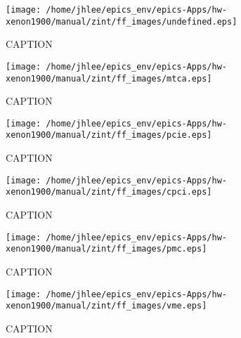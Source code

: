 \begin{figure}
  \centering
  \texttt{[image: /home/jhlee/epics\_env/epics-Apps/hw-xenon1900/manual/zint/ff\_images/undefined.eps]}
  \caption{CAPTION}
\end{figure}
\begin{figure}
  \centering
  \texttt{[image: /home/jhlee/epics\_env/epics-Apps/hw-xenon1900/manual/zint/ff\_images/mtca.eps]}
  \caption{CAPTION}
\end{figure}
\begin{figure}
  \centering
  \texttt{[image: /home/jhlee/epics\_env/epics-Apps/hw-xenon1900/manual/zint/ff\_images/pcie.eps]}
  \caption{CAPTION}
\end{figure}
\begin{figure}
  \centering
  \texttt{[image: /home/jhlee/epics\_env/epics-Apps/hw-xenon1900/manual/zint/ff\_images/cpci.eps]}
  \caption{CAPTION}
\end{figure}
\begin{figure}
  \centering
  \texttt{[image: /home/jhlee/epics\_env/epics-Apps/hw-xenon1900/manual/zint/ff\_images/pmc.eps]}
  \caption{CAPTION}
\end{figure}
\begin{figure}
  \centering
  \texttt{[image: /home/jhlee/epics\_env/epics-Apps/hw-xenon1900/manual/zint/ff\_images/vme.eps]}
  \caption{CAPTION}
\end{figure}
